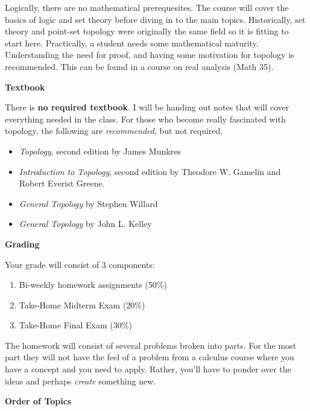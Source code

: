 \documentclass{article}
\begin{document}
    Logically, there are no mathematical prerequesites. The course will cover
    the basics of logic and set theory before diving in to the main topics.
    Historically, set theory and point-set topology were originally the same
    field so it is fitting to start here. Practically, a student needs some
    mathematical maturity. Understanding the need for proof, and having some
    motivation for topology is recommended. This can be found in a course on
    real analysis (Math 35).
    \par\hfill\par
    \textbf{Textbook}
    \par\hfill\par
    There is \textbf{no required textbook}. I will be handing out notes that
    will cover everything needed in the class.
    For those who become really fascinated with topology, the following are
    \textit{recommended}, but not required.
    \begin{itemize}
        \item \textit{Topology}, second edition by James Munkres
        \item \textit{Introduction to Topology}, second edition
            by Theodore W. Gamelin and Robert Everist Greene.
        \item \textit{General Topology} by Stephen Willard
        \item \textit{General Topology} by John L. Kelley
    \end{itemize}
    \par\hfill\par
    \textbf{Grading}
    \par\hfill\par
    Your grade will consist of 3 components:
    \begin{enumerate}
        \item Bi-weekly homework assignments (50\%)
        \item Take-Home Midterm Exam (20\%)
        \item Take-Home Final Exam (30\%)
    \end{enumerate}
    The homework will consist of several problems broken into parts. For the
    most part they will not have the feel of a problem from a calculus course
    where you have a concept and you need to apply. Rather, you'll have to
    ponder over the ideas and perhaps \textit{create} something new.
    \par\hfill\par
    \textbf{Order of Topics}
\end{document}
